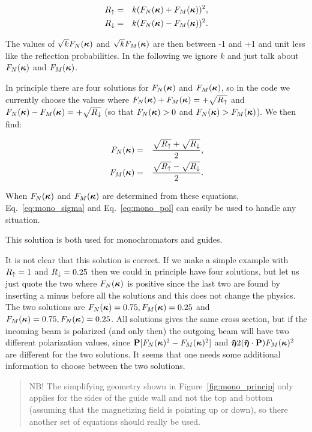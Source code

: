 \begin{eqnarray}
  \label{eq:mono_up}
  \Ru & = & k (\FN + \FM)^2,\\
  \label{eq:mono_down}
  \Rd & = & k (\FN - \FM)^2.
\end{eqnarray}

The values of $\sqrt{k}F_N(\mathbf{\mbox{\boldmath $\kappa$}})$ and $\sqrt{k}F_M(\mathbf{\mbox{\boldmath $\kappa$}})$ are then between -1 and +1 and
unit less like the reflection probabilities. In the following we ignore $k$ and
just talk about $F_N(\mathbf{\mbox{\boldmath $\kappa$}})$ and $F_M(\mathbf{\mbox{\boldmath $\kappa$}})$.

In principle there are four solutions for $F_N(\mathbf{\mbox{\boldmath $\kappa$}})$ and $F_M(\mathbf{\mbox{\boldmath $\kappa$}})$, so in the code we
currently choose the values where $F_N(\mathbf{\mbox{\boldmath $\kappa$}}) + F_M(\mathbf{\mbox{\boldmath $\kappa$}}) = +\sqrt{R_\uparrow}$ and $F_N(\mathbf{\mbox{\boldmath $\kappa$}}) - F_M(\mathbf{\mbox{\boldmath $\kappa$}}) =
+\sqrt{R_\downarrow}$ (so that $F_N(\mathbf{\mbox{\boldmath $\kappa$}})>0$ and $F_N(\mathbf{\mbox{\boldmath $\kappa$}})>F_M(\mathbf{\mbox{\boldmath $\kappa$}})$). We then find:

\begin{eqnarray}
  \label{eq:mono_nuc}
  \FN & = & \frac{\sqrt{\Ru} + \sqrt{\Rd}}{2},\\
  \label{eq:mono_mag}
  \FM & = & \frac{\sqrt{\Ru} - \sqrt{\Rd}}{2}.
\end{eqnarray}

When $F_N(\mathbf{\mbox{\boldmath $\kappa$}})$ and $F_M(\mathbf{\mbox{\boldmath $\kappa$}})$ are determined from these equations,
Eq.~\ref{eq:mono_sigma} and Eq.~\ref{eq:mono_pol} can easily be used to handle
any situation.

This solution is both used for monochromators and guides.

It is not clear that this solution is correct. If we make a simple example
with $R_\uparrow = 1$ and $R_\downarrow = 0.25$ then we could in principle have four
solutions, but let us just quote the two where $F_N(\mathbf{\mbox{\boldmath $\kappa$}})$ is positive since the
last two are found by inserting a minus before all the solutions and this does
not change the physics. The two solutions are $F_N(\mathbf{\mbox{\boldmath $\kappa$}}) = 0.75, F_M(\mathbf{\mbox{\boldmath $\kappa$}})=0.25$ and $F_M(\mathbf{\mbox{\boldmath $\kappa$}})
= 0.75, F_N(\mathbf{\mbox{\boldmath $\kappa$}})=0.25$. All solutions gives the same cross section, but if the
incoming beam is polarized (and only then) the outgoing beam will have two
different polarization values, since $\mathbf{P} [F_N(\mathbf{\mbox{\boldmath $\kappa$}})^2 - F_M(\mathbf{\mbox{\boldmath $\kappa$}})^2]$ and $\mathbf{\tilde{\mbox{\boldmath $\eta$}}} 2(\mathbf{\tilde{\mbox{\boldmath $\eta$}}}
\cdot \mathbf{P})F_M(\mathbf{\mbox{\boldmath $\kappa$}})^2$ are different for the two solutions. It seems that one needs
some additional information to choose between the two solutions.

\begin{quote}
  NB! The simplifying geometry shown in Figure~\ref{fig:mono_princip} only
  applies for the sides of the guide wall and not the top and bottom (assuming
  that the magnetizing field is pointing up or down), so there another set of
  equations should really be used.
\end{quote}

